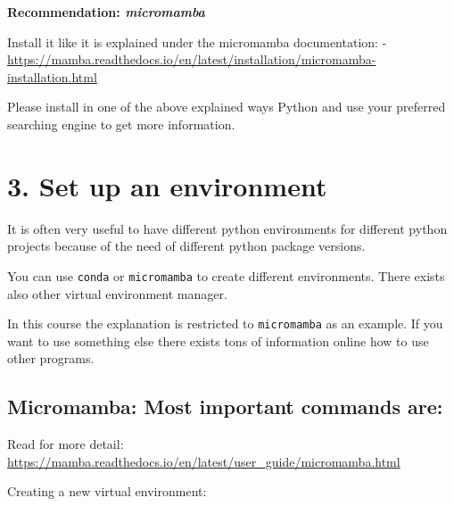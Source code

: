 \documentclass[
  letterpaper,
  DIV=11,
  numbers=noendperiod]{scrreprt}
\begin{document}
\begin{tcolorbox}[enhanced jigsaw, leftrule=.75mm, bottomrule=.15mm, colbacktitle=quarto-callout-tip-color!10!white, title=\textcolor{quarto-callout-tip-color}{\faLightbulb}\hspace{0.5em}{Tip}, breakable, arc=.35mm, toptitle=1mm, opacityback=0, titlerule=0mm, coltitle=black, colback=white, opacitybacktitle=0.6, colframe=quarto-callout-tip-color-frame, left=2mm, rightrule=.15mm, toprule=.15mm, bottomtitle=1mm]

\textbf{Recommendation: \emph{micromamba} }

Install it like it is explained under the micromamba documentation: -
\url{https://mamba.readthedocs.io/en/latest/installation/micromamba-installation.html}

\end{tcolorbox}

Please install in one of the above explained ways Python and use your
preferred searching engine to get more information.

\section*{3. Set up an environment}\label{set-up-an-environment}


It is often very useful to have different python environments for
different python projects because of the need of different python
package versions.

You can use \texttt{conda} or \texttt{micromamba} to create different
environments. There exists also other virtual environment manager.

In this course the explanation is restricted to \texttt{micromamba} as
an example. If you want to use something else there exists tons of
information online how to use other programs.

\subsection*{Micromamba: Most important commands
are:}\label{micromamba-most-important-commands-are}

Read for more detail:
\url{https://mamba.readthedocs.io/en/latest/user_guide/micromamba.html}

Creating a new virtual environment:
\end{document}
